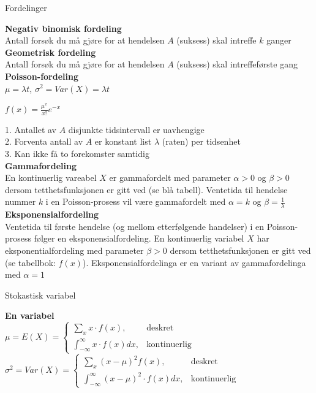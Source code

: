 \documentclass[final,hyperref={pdfpagelabels=false}]{beamer}
\begin{document}
\begin{frame}{}
\begin{columns}[t]
\begin{column}{.25\linewidth}
\begin{block}{\center\normalsize Fordelinger}
{					\textbf{Negativ binomisk fordeling}\\
					Antall forsøk du må gjøre for at hendelsen $A$ (suksess) skal intreffe $k$ ganger\\
					\textbf{Geometrisk fordeling}\\
					Antall forsøk du må gjøre for at hendelsen $A$ (suksess) skal intreffeførste gang\\
					\textbf{Poisson-fordeling}\\
					$\mu = \lambda t$, $\sigma^2=Var(X)=\lambda t$\par
					$f(x)=\frac{\mu^x}{x!}e^{-x}$\par
					1. Antallet av $A$ disjunkte tidsintervall er uavhengige\\
					2. Forventa antall av $A$ er konstant list $\lambda$ (raten) per tidsenhet\\
					3. Kan ikke få to forekomster samtidig\\
					\textbf{Gammafordeling}\\
					En kontinuerlig vareabel $X$ er gammafordelt med parameter $\alpha > 0$ og $\beta > 0$ dersom tetthetsfunksjonen er gitt ved (se blå tabell). Ventetida til hendelse nummer $k$ i en Poisson-prosess vil være gammafordelt med $\alpha=k$ og $\beta=\frac{1}{\lambda}$\\
					\textbf{Eksponensialfordeling}\\
					Ventetida til første hendelse (og mellom etterfølgende handelser) i en Poisson-prosess følger en eksponensialfordeling. En kontinuerlig variabel $X$ har eksponentialfordeling med parameter $\beta > 0$ dersom tetthetsfunksjonen er gitt ved (se tabellbok: $f(x)$). Eksponensialfordelinga er en variant av gammafordelinga med $\alpha=1$\\
				}
				\center\normalsize Stokastisk variabel\\
				{\footnotesize\raggedright
					\textbf{En variabel}\\
					$\mu=E(X)=\begin{cases}
						\sum_x x\cdot f(x), &\text{deskret}\\
						\int_{-\infty}^\infty x\cdot f(x) dx, &\text{kontinuerlig}
					\end{cases}$\\
					$\sigma^2=Var(X)=\begin{cases}
						\sum_x (x-\mu)^2f(x), &\text{deskret}\\
						\int_{-\infty}^\infty (x-\mu)^2\cdot f(x) dx, &\text{kontinuerlig}
					\end{cases}$\\
}
\end{block}
\end{column}
\end{columns}
\end{frame}
\end{document}
